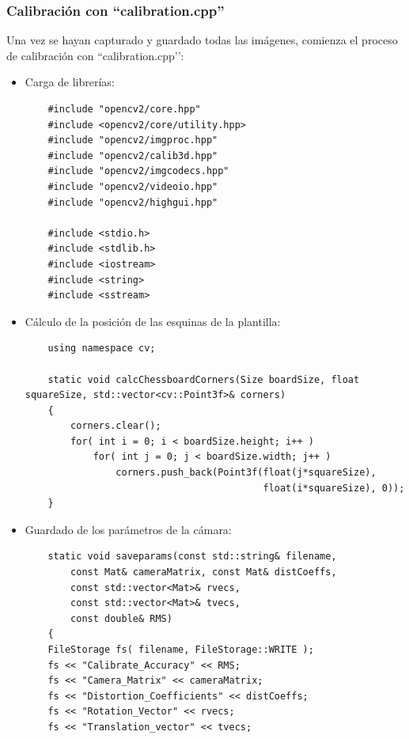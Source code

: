 \subsubsection{Calibración con ``calibration.cpp''}\label{s3_2_2_2}

Una vez se hayan capturado y guardado todas las imágenes, comienza el proceso de calibración con ``calibration.cpp’’:

\begin{itemize}
    \item Carga de librerías: \\
    
    \begin{verbatim} 
    #include "opencv2/core.hpp"
    #include <opencv2/core/utility.hpp>
    #include "opencv2/imgproc.hpp"
    #include "opencv2/calib3d.hpp"
    #include "opencv2/imgcodecs.hpp"
    #include "opencv2/videoio.hpp"
    #include "opencv2/highgui.hpp"
    
    #include <stdio.h>
    #include <stdlib.h>
    #include <iostream>
    #include <string> 
    #include <sstream>
    \end{verbatim} 
    
    
    \item Cálculo de la posición de las esquinas de la plantilla: \\
    
    \begin{verbatim} 
    using namespace cv;

    static void calcChessboardCorners(Size boardSize, float squareSize, std::vector<cv::Point3f>& corners)
    {
    	corners.clear();
        for( int i = 0; i < boardSize.height; i++ )
            for( int j = 0; j < boardSize.width; j++ )
                corners.push_back(Point3f(float(j*squareSize),
                                          float(i*squareSize), 0)); 
    }
    \end{verbatim} 
    
    \item Guardado de los parámetros de la cámara: \\

    \begin{verbatim} 
    static void saveparams(const std::string& filename, 
        const Mat& cameraMatrix, const Mat& distCoeffs,
    	const std::vector<Mat>& rvecs,
    	const std::vector<Mat>& tvecs, 
    	const double& RMS)
    {
    FileStorage fs( filename, FileStorage::WRITE );
    fs << "Calibrate_Accuracy" << RMS;
    fs << "Camera_Matrix" << cameraMatrix;
    fs << "Distortion_Coefficients" << distCoeffs;
    fs << "Rotation_Vector" << rvecs;
    fs << "Translation_vector" << tvecs;
    

\end{verbatim}
\end{itemize}
